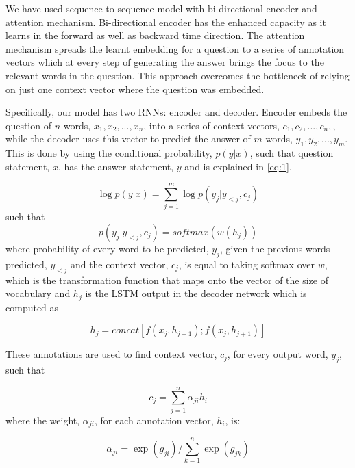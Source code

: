 \documentclass[conference]{IEEEtran}
\begin{document}
We have used sequence to sequence model with bi-directional encoder and attention mechanism. Bi-directional encoder has the enhanced capacity as it learns in the forward as well as backward time direction. The attention mechanism spreads the learnt embedding for a question to a series of annotation vectors which at every step of generating the answer brings the focus to the relevant words in the question. This approach overcomes the bottleneck of relying on just one context vector where the question was embedded.

Specifically, our model has two RNNs: encoder and decoder. Encoder embeds the question of $n$ words, $x_1,x_2,...,x_n$, into a series of context vectors, \textbf{$c_1, c_2,...,c_n,$}, while the decoder uses this vector to predict the answer of $m$ words, $y_1, y_2, ..., y_m$.  This is done by using the conditional probability, $p(y|x)$, such that question statement, \textbf{$x$}, has the answer statement, \textbf{$y$} and is explained in \ref{eq:1}.	 

\begin{equation}\label{eq:1}
\log p(y|x) = \sum_{j=1}^{m} \log p (y_j|y_{<j},c_j) 
\end{equation}
such that   
\begin{equation}\label{eq:2}
p (y_j|y_{<j},c_j) = softmax (w(h_j)) 
\end{equation}
where probability of every word to be predicted, $y_j$, given the previous words predicted, $y_{<j}$ and the context vector, $c_j$, is equal to taking softmax over $w$, which is the transformation function that maps onto the vector of the size of vocabulary and $h_j$ is the LSTM output in the decoder network which is computed as 

\begin{equation}\label{eq:3}
h_{j} = concat[f (x_j,{h}_{j-1});f (x_j,{h}_{j+1})] 
\end{equation}

These annotations are used to find context vector, $c_j$, for every output word, $y_j$, such that 

\begin{equation}\label{eq:6}
c_{j} = \sum_{j=1}^{n} \alpha_{ji}h_i 
\end{equation}
where the weight, $\alpha_{ji}$, for each annotation vector, $h_i$, is:

\begin{equation}\label{eq:7}
\alpha_{ji} = \exp(g_{ji})/\sum_{k=1}^{n} \exp (g_{jk}) 
\end{equation}
\end{document}
